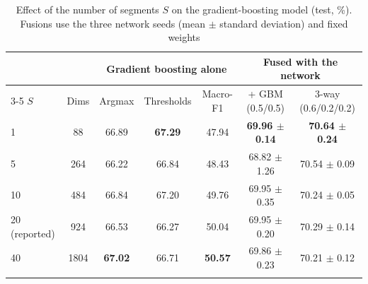 \documentclass[pdflatex,sn-basic]{sn-jnl}
\begin{document}
\begin{table}[t]
\tablebodyfont
\setlength{\tabcolsep}{3pt}
\caption{Effect of the number of segments $S$ on the gradient-boosting model (test, \%). Fusions use the three network seeds (mean $\pm$ standard deviation) and fixed weights}\label{tab:segments}
\begin{tabular*}{\textwidth}{@{\extracolsep\fill}lcccccc}
\toprule
& & \multicolumn{3}{c}{Gradient boosting alone} & \multicolumn{2}{c}{Fused with the network}\\
\cmidrule{3-5}\cmidrule{6-7}
$S$ & Dims & Argmax & Thresholds & Macro-F1 & + GBM (0.5/0.5) & 3-way (0.6/0.2/0.2)\\
\midrule
1 & 88 & 66.89 & \textbf{67.29} & 47.94 & \textbf{69.96 $\pm$ 0.14} & \textbf{70.64 $\pm$ 0.24}\\
5 & 264 & 66.22 & 66.84 & 48.43 & 68.82 $\pm$ 1.26 & 70.54 $\pm$ 0.09\\
10 & 484 & 66.84 & 67.20 & 49.76 & 69.95 $\pm$ 0.35 & 70.24 $\pm$ 0.05\\
20 (reported) & 924 & 66.53 & 66.27 & 50.04 & 69.95 $\pm$ 0.20 & 70.29 $\pm$ 0.14\\
40 & 1804 & \textbf{67.02} & 66.71 & \textbf{50.57} & 69.86 $\pm$ 0.23 & 70.21 $\pm$ 0.12\\
\botrule
\end{tabular*}
\end{table}
\end{document}
